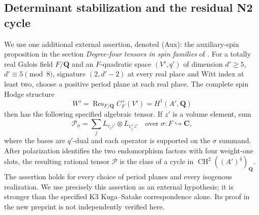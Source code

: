 \documentclass[10pt,reqno]{article}
\theoremstyle{emphasizedplain}
\theoremstyle{emphasizeddefinition}
\theoremstyle{emphasizeddefinition}
\DeclareMathOperator{\Res}{Res}
\DeclareMathOperator{\CH}{CH}
\newcommand{\Q}{\mathbf Q}
\newcommand{\C}{\mathbf C}
\begin{document}
\subsection*{Determinant stabilization and the residual N2 cycle}
We use one additional external assertion, denoted (Aux):
the auxiliary-spin proposition in the section
\emph{Degree-four tensors in spin families} of \cite{OpenAIK3Products}.
For a totally real Galois field $F/\Q$ and an $F$-quadratic space
$(V',q')$ of dimension $d'\geq5$, $d'\equiv5\pmod8$, signature
$(2,d'-2)$ at every real place and Witt index at least two,
choose a positive period plane at each real place. The complete
spin Hodge structure
\[
 W'=\Res_{F/\Q}C_F^+(V')=H^1(A',\Q)
\]
then has the following specified algebraic tensor. If $z'$ is a
volume element, sum
\[
 \mathcal P_\sigma=\sum_jL_{v_jz'}\otimes L_{v_j^\vee z'}
 \quad\text{over }\sigma:F\hookrightarrow\C,
                                                        \tag{N2.1}
\]
where the bases are $q'$-dual and each operator is supported on
the $\sigma$ summand. After polarization identifies the two
endomorphism factors with four weight-one slots, the resulting
rational tensor $\mathcal P$ is the class of a cycle in
$\CH^2((A')^4)_\Q$. The assertion holds for every choice of period
planes and every isogenous realization. We use precisely this
assertion as an external hypothesis; it is stronger than the
specified K3 Kuga--Satake correspondence alone. Its proof in the
new preprint is not independently verified here.
\end{document}
